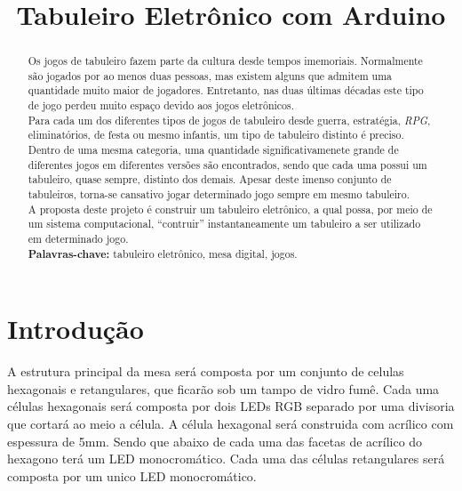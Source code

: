 \documentclass[a4paper,10pt]{article}
\title{Tabuleiro Eletrônico com Arduino}
\author{}
\date{}
\begin{document}
\maketitle

\begin{abstract}
Os jogos de tabuleiro fazem parte da cultura desde tempos imemoriais. Normalmente são jogados por ao menos duas pessoas, mas existem alguns que admitem uma quantidade muito maior de jogadores. Entretanto, nas duas últimas décadas este tipo de jogo perdeu muito espaço devido aos jogos eletrônicos. \\ 

Para cada um dos diferentes tipos de jogos de tabuleiro desde guerra, estratégia, {\it RPG}, eliminatórios, de festa ou mesmo infantis, um tipo de tabuleiro distinto é preciso. Dentro de uma mesma categoria, uma quantidade significativamenete grande de diferentes jogos em diferentes versões são encontrados, sendo que cada uma possui um tabuleiro, quase sempre, distinto dos demais. Apesar deste imenso conjunto de tabuleiros, torna-se cansativo jogar determinado jogo sempre em mesmo tabuleiro. \\

A proposta deste projeto é construir um tabuleiro eletrônico, a qual possa, por meio de um sistema computacional, ``contruir'' instantaneamente um tabuleiro a ser utilizado em determinado jogo. \\

\noindent \textbf{Palavras-chave:} tabuleiro eletrônico, mesa digital, jogos.
\end{abstract}



\section{Introdução}

A estrutura principal da mesa será composta por um conjunto de celulas hexagonais e retangulares, que ficarão sob um tampo de vidro fumê. 
Cada uma células hexagonais será composta por dois LEDs RGB separado por uma divisoria que cortará ao meio a célula. 
A célula hexagonal será construida com acrílico com espessura de 5mm. Sendo que abaixo de cada uma das facetas de acrílico do hexagono terá um LED monocro\-mático.
Cada uma das células retangulares será composta por um unico LED monocromático. \\
\end{document}
